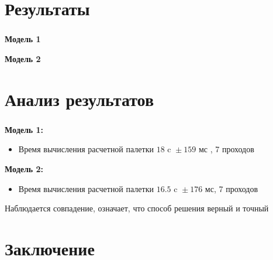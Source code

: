 
\section{Результаты}

\begin{frame}
\frametitle{\insertsection}

\vspace{-0.5cm}
\begin{minipage}[t]{0.47\linewidth}
    \textbf{Модель 1}
\end{minipage}
\hfill
\begin{minipage}[t]{0.47\linewidth}
    \textbf{Модель 2}
\end{minipage}

\end{frame}


\section{Анализ результатов}

\begin{frame}
\frametitle{\insertsection}

\textbf{Модель 1:}
\begin{itemize}
    \item Время вычисления расчетной палетки ${18 \text{ c } \pm 159 \text{ мс }}$, 7 проходов
\end{itemize}

\textbf{Модель 2:}
\begin{itemize}
    \item Время вычисления расчетной палетки ${16.5 \text{ c } \pm 176 \text{ мс}}$, 7 проходов
\end{itemize}

Наблюдается совпадение, означает, что способ решения верный и точный

\end{frame}


\section{Заключение}

